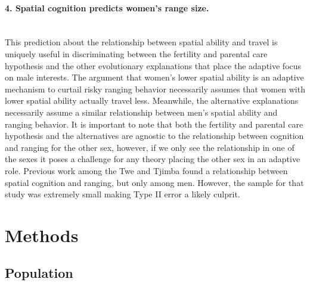 
\paragraph{4. Spatial cognition predicts women's range size.}\mbox{}\\

This prediction about the relationship between spatial ability and travel is uniquely useful in discriminating between the fertility and parental care hypothesis and the other evolutionary explanations that place the adaptive focus on male interests.  The argument that women's lower spatial ability is an adaptive mechanism to curtail risky ranging behavior necessarily assumes that women with lower spatial ability actually travel less.  Meanwhile, the alternative explanations necessarily assume a similar relationship between men's spatial ability and ranging behavior.  It is important to note that both the fertility and parental care hypothesis and the alternatives are agnostic to the relationship between cognition and ranging for the other sex, however, if we only see the relationship in one of the sexes it poses a challenge for any theory placing the other sex in an adaptive role.  Previous work among the Twe and Tjimba found a relationship between spatial cognition and ranging, but only among men.  However, the sample for that study was extremely small making Type II error a likely culprit.


\section{Methods}
\label{sec:2}
	\subsection{Population}

